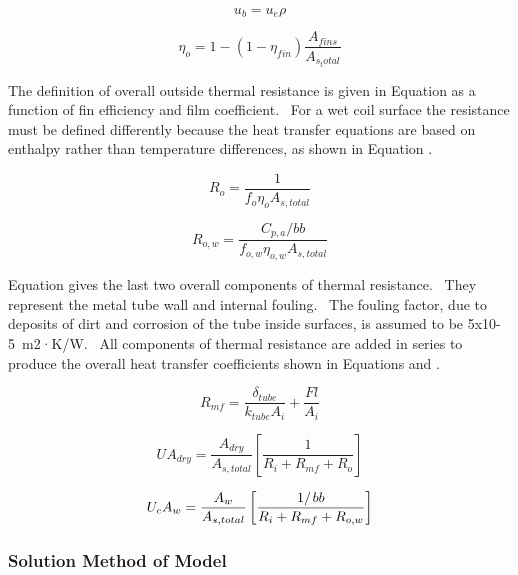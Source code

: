 \begin{equation}
{u_b} = {u_e}\rho
\end{equation}

\begin{equation}
{\eta_o} = 1 - (1 - {\eta_{fin}})\frac{{{A_{fins}}}}{{{A_{s_total}}}}
\end{equation}

The definition of overall outside thermal resistance is given in Equation as a function of fin efficiency and film coefficient.~ For a wet coil surface the resistance must be defined differently because the heat transfer equations are based on enthalpy rather than temperature differences, as shown in Equation .

\begin{equation}
{R_o} = \frac{1}{{{f_o}{\eta_o}{A_{s,total}}}}
\end{equation}

\begin{equation}
  R_{o,w} = \frac{C_{p,a}/bb}{f_{o,w}\eta_{o,w}A_{s,total}}
\end{equation}

Equation gives the last two overall components of thermal resistance.~ They represent the metal tube wall and internal fouling.~ The fouling factor, due to deposits of dirt and corrosion of the tube inside surfaces, is assumed to be 5x10-5~m2·K/W.~ All components of thermal resistance are added in series to produce the overall heat transfer coefficients shown in Equations and .

\begin{equation}
{R_{mf}} = \frac{{{\delta_{tube}}}}{{{k_{tube}}{A_i}}} + \frac{{Fl}}{{{A_i}}}
\end{equation}

\begin{equation}
U{A_{dry}} = \frac{{{A_{dry}}}}{{{A_{s,total}}}}\left[ {\frac{1}{{{R_i} + {R_{mf}} + {R_o}}}} \right]
\end{equation}

\begin{equation}
{U_c}{A_w} = \frac{{{A_w}}}{{{A_{s,total}}}}\left[ {\frac{{{1 \mathord{\left/ {\vphantom {1 {bb}}} \right. } {bb}}}}{{{R_i} + {R_{mf}} + {R_{o,w}}}}} \right]
\end{equation}

\subsubsection{Solution Method of Model}\label{solution-method-of-model}

